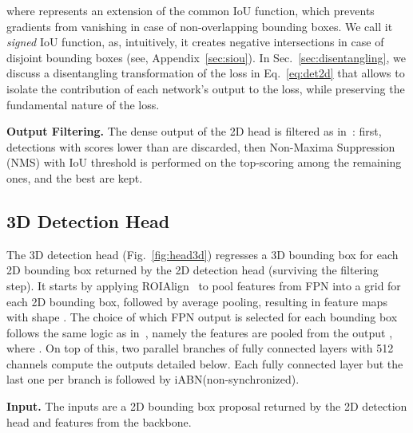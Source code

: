\documentclass[10pt,twocolumn,letterpaper]{article}
\newcommand{\iABN}{iABN\xspace}
\renewcommand{\paragraph}[1]{

        \vspace{3pt}
	\noindent\textbf{#1}}
\begin{document}
where  represents an extension of the common IoU function, which prevents gradients from vanishing in case of non-overlapping bounding boxes. 
We call it \emph{signed} IoU function, as, intuitively, it creates negative intersections in case of disjoint bounding boxes (see, Appendix~\ref{sec:siou}).
In Sec.~\ref{sec:disentangling}, we discuss a disentangling transformation of the loss in Eq.~\eqref{eq:det2d} that allows to isolate the contribution of each network's output to the loss, while preserving the fundamental nature of the loss.

\paragraph{Output Filtering.}
The dense output of the 2D head is filtered as in~\cite{Lin+17}: first, detections with scores lower than  are discarded, then Non-Maxima Suppression (NMS) with IoU threshold  is performed on the  top-scoring among the remaining ones, and the best  are kept.


\subsection{3D Detection Head}\label{sec:head3D}
The 3D detection head (Fig.~\ref{fig:head3d}) regresses a 3D bounding box for each 2D bounding box returned by the 2D detection head (surviving the filtering step). It starts by applying ROIAlign~\cite{He2017} to pool features from FPN into a  grid for each 2D bounding box, followed by  average pooling, resulting in feature maps with shape .
The choice of which FPN output is selected for each bounding box  follows the same logic as in~\cite{Lin2016}, namely the features are pooled from the output , where .
On top of this, two parallel branches of fully connected layers with 512 channels compute the outputs detailed below. Each fully connected layer but the last one per branch is followed by \iABN (non-synchronized).

\paragraph{Input.} The inputs are a 2D bounding box proposal  returned by the 2D detection head and features  from the backbone.
\end{document}
